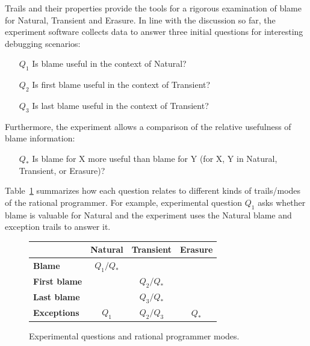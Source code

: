 
Trails and their properties provide the tools for a rigorous examination of
blame for Natural, Transient and Erasure. In line with the discussion so far,
the experiment software collects data to answer three initial questions for 
interesting debugging scenarios:
\begin{itemize}
\item[$Q_1$] Is blame useful in the context of Natural?

\item[$Q_2$] Is first blame useful in the context of Transient?

\item[$Q_3$] Is last blame useful in the context of Transient?

\end{itemize}

Furthermore, the experiment allows a comparison of the relative usefulness of blame
information:
\begin{itemize}
\item[$Q_*$] Is blame for X more useful than blame for Y (for X, Y in Natural, Transient, or Erasure)?
\end{itemize}


Table~\ref{fig:experiment-outline} summarizes how each question relates to
different kinds of trails/modes of the rational programmer. For example, experimental
question $Q_1$ asks whether blame is valuable for Natural and the experiment
uses the Natural blame and exception trails to answer it.

\begin{figure}[ht]
\center
{\begin{tabular}{l|c|c|c}
                        & {\bf Natural}  & {\bf Transient} &  {\bf Erasure} \\ \hline 
{\bf Blame}             &  $Q_1/Q_*$    &                  &                \\
{\bf First blame}       &               &     $Q_2/Q_*$    &                 \\
{\bf Last blame}        &               &     $Q_3/Q_*$    &                 \\
{\bf Exceptions}        &      $Q_1$    &     $Q_2/Q_3$    &      $Q_*$      \\
\end{tabular}}
  \caption{ Experimental questions and rational programmer modes.}
  \label{fig:experiment-outline}
\end{figure}

